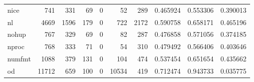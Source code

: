 \begin{longtable}{lrrrrrrrrr}
nice      &                                                741 &                                                331 &                                                 69 &                                                  0 &                                                 52 &                                                289 &                                           0.465924 &                               0.553306 &                             0.390013 \\
nl        &                                               4669 &                                               1596 &                                                179 &                                                  0 &                                                722 &                                               2172 &                                           0.590758 &                               0.658171 &                             0.465196 \\
nohup     &                                                767 &                                                329 &                                                 69 &                                                  0 &                                                 82 &                                                287 &                                           0.476858 &                               0.571056 &                             0.374185 \\
nproc     &                                                768 &                                                333 &                                                 71 &                                                  0 &                                                 54 &                                                310 &                                           0.479492 &                               0.566406 &                             0.403646 \\
numfmt    &                                               1088 &                                                379 &                                                131 &                                                  0 &                                                104 &                                                474 &                                           0.537454 &                               0.651654 &                             0.435662 \\
od        &                                              11712 &                                                659 &                                                100 &                                                  0 &                                              10534 &                                                419 &                                           0.712474 &                               0.943733 &                             0.035775 \\

\end{longtable}
